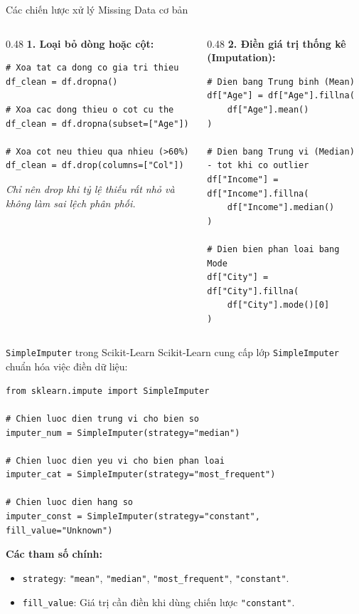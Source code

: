 \documentclass[aspectratio=169,11pt]{beamer}
\newcommand{\code}[1]{\texttt{#1}}
\newcommand{\smallgap}{\vspace{0.35em}}
\begin{document}
\begin{frame}[fragile]{Các chiến lược xử lý Missing Data cơ bản}
\begin{columns}[T]
\begin{column}{0.48\textwidth}
\textbf{1. Loại bỏ dòng hoặc cột:}
\begin{lstlisting}[style=pythonstyle]
# Xoa tat ca dong co gia tri thieu
df_clean = df.dropna()

# Xoa cac dong thieu o cot cu the
df_clean = df.dropna(subset=["Age"])

# Xoa cot neu thieu qua nhieu (>60%)
df_clean = df.drop(columns=["Col"])
\end{lstlisting}
\textit{Chỉ nên drop khi tỷ lệ thiếu rất nhỏ và không làm sai lệch phân phối.}
\end{column}
\begin{column}{0.48\textwidth}
\textbf{2. Điền giá trị thống kê (Imputation):}
\begin{lstlisting}[style=pythonstyle]
# Dien bang Trung binh (Mean)
df["Age"] = df["Age"].fillna(
    df["Age"].mean()
)

# Dien bang Trung vi (Median) - tot khi co outlier
df["Income"] = df["Income"].fillna(
    df["Income"].median()
)

# Dien bien phan loai bang Mode
df["City"] = df["City"].fillna(
    df["City"].mode()[0]
)
\end{lstlisting}
\end{column}
\end{columns}
\end{frame}

\begin{frame}[fragile]{\texttt{SimpleImputer} trong Scikit-Learn}
Scikit-Learn cung cấp lớp \code{SimpleImputer} chuẩn hóa việc điền dữ liệu:
\begin{lstlisting}[style=pythonstyle]
from sklearn.impute import SimpleImputer

# Chien luoc dien trung vi cho bien so
imputer_num = SimpleImputer(strategy="median")

# Chien luoc dien yeu vi cho bien phan loai
imputer_cat = SimpleImputer(strategy="most_frequent")

# Chien luoc dien hang so
imputer_const = SimpleImputer(strategy="constant", fill_value="Unknown")
\end{lstlisting}

\smallgap
\textbf{Các tham số chính:}
\begin{itemize}
  \item \code{strategy}: \code{"mean"}, \code{"median"}, \code{"most\_frequent"}, \code{"constant"}.
  \item \code{fill\_value}: Giá trị cần điền khi dùng chiến lược \code{"constant"}.
\end{itemize}
\end{frame}
\end{document}
